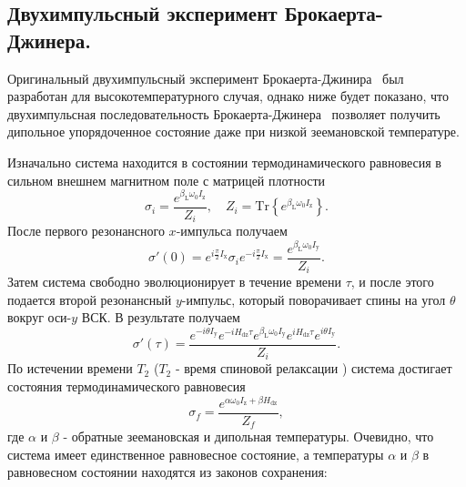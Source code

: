 \subsection{Двухимпульсный эксперимент Брокаерта-Джинера.}
\label{seq:jeener-sequence}

Оригинальный двухимпульсный эксперимент Брокаерта-Джинира~\cite{Jeener1967} был разработан  для высокотемпературного случая,
однако ниже будет показано,
что двухимпульсная последовательность Брокаерта-Джинера~\cite{Goldman1970,Jeener1967}
позволяет получить дипольное упорядоченное состояние
даже при низкой зеемановской температуре.

Изначально система находится в состоянии термодинамического равновесия в сильном внешнем магнитном поле с матрицей плотности
%
\begin{equation}
  \label{eq:a1}
  \sigma_{i} = \dfrac{e^{\beta_\mathrm{L} \omega_{0} I_\mathrm{z}}}{Z_{i}} ,
  \quad
  Z_{i} = \mathrm{Tr}\left\{e^{\beta_\mathrm{L} \omega_{0} I_\mathrm{z}} \right\}.
\end{equation}
%
После первого резонансного $x$-импульса получаем
%
\begin{equation}
  \label{eq:a2}
  \sigma'(0) = e^{ i \frac \pi 2 I_\mathrm{x}}
  \sigma_{i}
  e^{-i \frac \pi 2 I_\mathrm{x}}
  = \dfrac{e^{\beta_\mathrm{L} \omega_{0} I_\mathrm{y}}}{Z_{i}} .
\end{equation}
%
Затем система свободно эволюционирует в течение времени $\tau$,
и после этого подается второй резонансный $y$-импульс, который поворачивает спины на угол $\theta$ вокруг оси-$y$ ВСК.
В результате получаем
\begin{equation}
  \label{eq:a3}
  \sigma'(\tau)
  = \dfrac{
   e^{-i \theta I_\mathrm{y}} e^{-i H_\mathrm{dz} \tau}
   e^{\beta_\mathrm{L} \omega_{0} I_\mathrm{y}}
   e^{i H_\mathrm{dz} \tau} e^{i \theta I_\mathrm{y}}
  }{Z_{i}}.
\end{equation}
%
По истечении времени $T_2$ ($T_2$ - время спиновой релаксации \cite{Goldman1970}) система достигает состояния термодинамического равновесия
\begin{equation}
  \label{eq:a4}
  \sigma_{f}
  = \dfrac{ e^{\alpha \omega_{0} I_\mathrm{z} + \beta H_\mathrm{dz}} }{Z_f},
\end{equation}
%
где $\alpha$ и $\beta$ - обратные зеемановская и дипольная температуры.
Очевидно, что система имеет единственное  равновесное состояние, а
 температуры $\alpha$ и $\beta$ в равновесном состоянии находятся из
законов сохранения:

